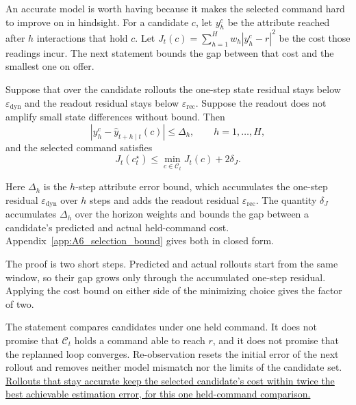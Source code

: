 An accurate model is worth having because it makes the selected command hard
to improve on in hindsight. For a candidate $c$, let $y_h^c$ be the attribute
reached after $h$ interactions that hold $c$. Let
$J_t(c)=\sum_{h=1}^{H}w_h|y_h^c-r|^2$ be the cost those readings incur. The
next statement bounds the gap between that cost and the smallest one on
offer.
\begin{proposition}
\label{prop:selection}
Suppose that over the candidate rollouts the one-step state residual stays
below $\varepsilon_{\mathrm{dyn}}$ and the readout residual stays below
$\varepsilon_{\mathrm{rec}}$. Suppose the readout does not amplify small state
differences without bound. Then
\begin{equation}
    \left|
        y_h^c-\widehat{y}_{t+h\mid t}(c)
    \right|
    \leq
    \Delta_h,
    \qquad h=1,\ldots,H,
    \label{eq:prediction_bound}
\end{equation}
and the selected command satisfies
\begin{equation}
    J_t(c_t^{\star})
    \leq
    \min_{c\in\mathcal{C}_t}J_t(c)+2\delta_J.
    \label{eq:selection_bound}
\end{equation}
\end{proposition}
Here $\Delta_h$ is the $h$-step attribute error bound, which accumulates the
one-step residual $\varepsilon_{\mathrm{dyn}}$ over $h$ steps and adds the
readout residual $\varepsilon_{\mathrm{rec}}$. The quantity $\delta_J$
accumulates $\Delta_h$ over the horizon weights and bounds the gap between a
candidate's predicted and actual held-command cost.
Appendix~\ref{app:A6_selection_bound} gives both in closed form.

The proof is two short steps. Predicted and actual rollouts start from the
same window, so their gap grows only through the accumulated one-step
residual. Applying the cost bound on either side of the minimizing choice
gives the factor of two.

The statement compares candidates under one held command. It does not promise
that $\mathcal{C}_t$ holds a command able to reach $r$, and it does not
promise that the replanned loop converges. Re-observation resets the initial
error of the next rollout and removes neither model mismatch nor the limits of
the candidate set. \uline{Rollouts that stay accurate keep the selected
candidate's cost within twice the best achievable estimation error, for this
one held-command comparison.}
